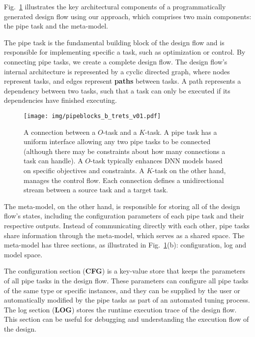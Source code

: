  Fig.~\ref{fig:pipetasks} illustrates the key architectural components of a programmatically generated design flow using our approach, which comprises two main components: the pipe task and the meta-model.

The pipe task is the fundamental building block of the design flow and is responsible for implementing specific a task, such as optimization or control. By connecting pipe tasks, we  create a complete design flow. The design flow's internal architecture is represented by a cyclic directed graph, where nodes represent tasks, and edges represent \textbf{paths} between tasks. A path represents a dependency between two tasks, such that a task can only be executed if its dependencies have finished executing.



\begin{figure}[tp]
   \centering
    \texttt{[image: img/pipeblocks\_b\_trets\_v01.pdf]}
  \caption{A connection between a $O$-task and a $K$-task. A pipe task has a uniform interface allowing any two pipe tasks to be connected (although there may be constraints about how many connections a task can handle). A $O$-task typically enhances DNN models based on specific objectives and constraints. A $K$-task on the other hand, manages the control flow. Each connection defines a unidirectional stream between a source task and a target task.}
  \label{fig:pipetasks} 
\end{figure}



The meta-model, on the other hand, is responsible for storing all of the design flow's states, including the configuration parameters of each pipe task and their respective outputs. Instead of communicating directly with each other, pipe tasks share information through the meta-model, which serves as a shared space. The meta-model has three sections, as illustrated in Fig.~\ref{fig:pipetasks}(b): configuration, log and model space.

The configuration section (\textbf{CFG}) is a key-value store that keeps the parameters of all pipe tasks in the design flow. These parameters can configure all pipe tasks of the same type or specific instances, and they can be supplied by the user or automatically modified by the pipe tasks as part of an automated tuning process.
The log section (\textbf{LOG}) stores the runtime execution trace of the design flow. This section can be useful for debugging and understanding the execution flow of the design.

